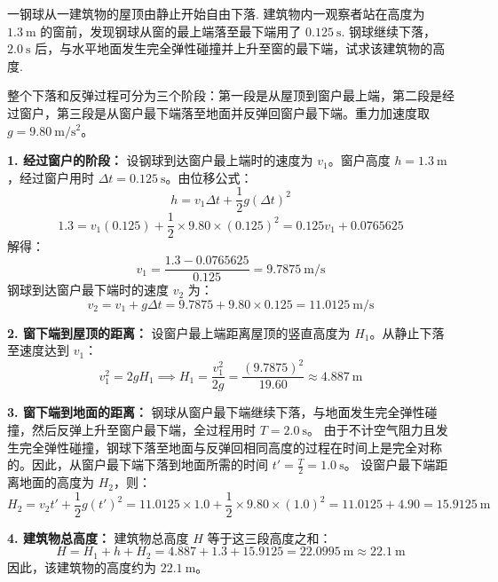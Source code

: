 \begin{exercise}\label{ex:2.3}
一钢球从一建筑物的屋顶由静止开始自由下落. 建筑物内一观察者站在高度为 $1.3 \ \mathrm{m}$ 的窗前，发现钢球从窗的最上端落至最下端用了 $0.125 \ \mathrm{s}$. 钢球继续下落，$2.0 \ \mathrm{s}$ 后，与水平地面发生完全弹性碰撞并上升至窗的最下端，试求该建筑物的高度.
\end{exercise}
\begin{solution}
整个下落和反弹过程可分为三个阶段：第一段是从屋顶到窗户最上端，第二段是经过窗户，第三段是从窗户最下端落至地面并反弹回窗户最下端。重力加速度取 $g = 9.80 \ \mathrm{m/s^2}$。

\textbf{1. 经过窗户的阶段：}
设钢球到达窗户最上端时的速度为 $v_1$。窗户高度 $h = 1.3 \ \mathrm{m}$，经过窗户用时 $\Delta t = 0.125 \ \mathrm{s}$。由位移公式：
$$ h = v_1 \Delta t + \frac{1}{2}g (\Delta t)^2 $$
$$ 1.3 = v_1 (0.125) + \frac{1}{2} \times 9.80 \times (0.125)^2 = 0.125 v_1 + 0.0765625 $$
解得：
$$ v_1 = \frac{1.3 - 0.0765625}{0.125} = 9.7875 \ \mathrm{m/s} $$
钢球到达窗户最下端时的速度 $v_2$ 为：
$$ v_2 = v_1 + g \Delta t = 9.7875 + 9.80 \times 0.125 = 11.0125 \ \mathrm{m/s} $$

\textbf{2. 窗下端到屋顶的距离：}
设窗户最上端距离屋顶的竖直高度为 $H_1$。从静止下落至速度达到 $v_1$：
$$ v_1^2 = 2gH_1 \implies H_1 = \frac{v_1^2}{2g} = \frac{(9.7875)^2}{19.60} \approx 4.887 \ \mathrm{m} $$

\textbf{3. 窗下端到地面的距离：}
钢球从窗户最下端继续下落，与地面发生完全弹性碰撞，然后反弹上升至窗户最下端，全过程用时 $T = 2.0 \ \mathrm{s}$。
由于不计空气阻力且发生完全弹性碰撞，钢球下落至地面与反弹回相同高度的过程在时间上是完全对称的。因此，从窗户最下端下落到地面所需的时间 $t' = \frac{T}{2} = 1.0 \ \mathrm{s}$。
设窗户最下端距离地面的高度为 $H_2$，则：
$$ H_2 = v_2 t' + \frac{1}{2}g(t')^2 = 11.0125 \times 1.0 + \frac{1}{2} \times 9.80 \times (1.0)^2 = 11.0125 + 4.90 = 15.9125 \ \mathrm{m} $$

\textbf{4. 建筑物总高度：}
建筑物总高度 $H$ 等于这三段高度之和：
$$ H = H_1 + h + H_2 = 4.887 + 1.3 + 15.9125 = 22.0995 \ \mathrm{m} \approx 22.1 \ \mathrm{m} $$
因此，该建筑物的高度约为 $22.1 \ \mathrm{m}$。
\end{solution}

